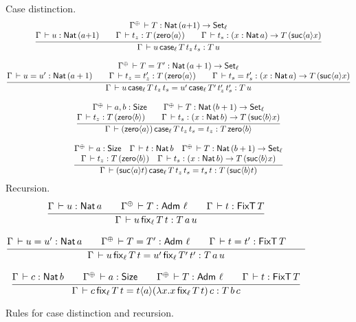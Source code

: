 \begin{figure}[htbp]
\flushleft
\hrulefill
\\[1ex]
Case distinction.
\begin{gather*}
  \ru{\resurrect\Gamma \der T : \Nat (a {+} 1) \to \Set[\ell] \\
      \Gamma \der u : \Nat (a {+} 1) \qquad
      \Gamma \der t_z : T \, (\zero{a}) \qquad
      \Gamma \der t_s : (x : \Nat a) \to T \, (\suc{a} x)
    }{\Gamma \der u\,\case[\ell] T {t_z} t_s : T \, u}
\\[2ex]
  \ru{\resurrect\Gamma \der T = T' : \Nat (a + 1) \to \Set[\ell] \\
      \Gamma \der u = u' : \Nat (a + 1) \qquad
      \Gamma \der t_z = t_z' : T \, (\zero a) \qquad
      \Gamma \der t_s = t_s' : (x : \Nat a) \to T \, (\suc a x)
    }{\Gamma \der u\,\case[\ell] T {t_z} t_s = u'\,\case[\ell] {T'} {t_z'} t_s' : T \, u}
\\[2ex]
  \ru{\resurrect\Gamma \der a, b : \Size \qquad
      \resurrect\Gamma \der T : \Nat (b + 1) \to \Set[\ell] \\
      \Gamma \der t_z : T\,(\zero{b}) \qquad
      \Gamma \der t_s : (x : \Nat b) \to T\,(\suc{b}x)
    }{\Gamma \der (\zero{a})\,\case[\ell] T {t_z} {t_s} = t_z : T\,\zero{b}}
\\[2ex]
  \ru{\resurrect\Gamma \der a : \Size \quad
      \Gamma \der t : \Nat b \quad
      \resurrect\Gamma \der T : \Nat (b + 1) \to \Set[\ell] \\
      \Gamma \der t_z : T\,(\zero{b}) \quad
      \Gamma \der t_s : (x : \Nat b) \to T\,(\suc{b}x)
    }{\Gamma \der (\suc{a} t)\,\case[\ell] T {t_z} {t_s} = t_s\,t : T\,(\suc{b} t)}
\end{gather*}
Recursion.
\begin{gather*}
  \ru{\Gamma \der u : \Nat a \qquad
      \resurrect\Gamma \der T : \Adm\,\ell \qquad %
      \Gamma \der t : \FixT\, T
     }{\Gamma \der u\,\fix[\ell] T t : T \,a \, u}
\\[2ex]
  \ru{\Gamma \der u = u' : \Nat a \qquad
      \resurrect\Gamma \der T = T' : \Adm\,\ell \qquad %
      \Gamma \der t = t' : \FixT\,T \qquad %
     }{\Gamma \der u\,\fix[\ell] T t = u'\,\fix[\ell] {T'} t' : T \, a \, u}
\\[2ex]
  \ru{\Gamma \der c : \Nat b \qquad
      \resurrect\Gamma \der a : \Size \qquad
      \resurrect\Gamma \der T : \Adm\,\ell \qquad %
      \Gamma \der t : \FixT\,T %
     }{\Gamma \der c\,\fix[\ell] T t = t\ann a (\lambda x. x\,\fix[\ell] T t)\, c : T \,b \, c
     }%
\end{gather*}
\hrulefill
\vspace{-2ex}
  \caption{Rules for case distinction and recursion.}
  \label{fig:nat}
\end{figure}
